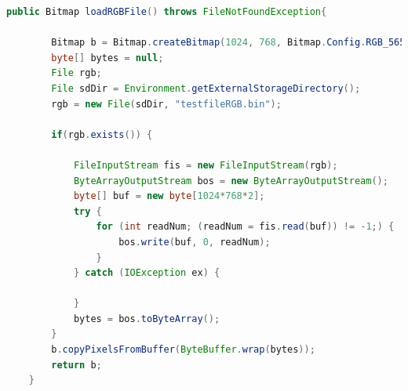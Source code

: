 \clearpage
\begin{lstlisting}[caption=Methode \textit{loadRGBFile()} zum Einlesen einer BIN-Datei im RGB565-Format zu Testzwecken, label=lst:BIN_to_Bitmap, language=Java]
public Bitmap loadRGBFile() throws FileNotFoundException{

        Bitmap b = Bitmap.createBitmap(1024, 768, Bitmap.Config.RGB_565);
        byte[] bytes = null;
        File rgb;
        File sdDir = Environment.getExternalStorageDirectory();
        rgb = new File(sdDir, "testfileRGB.bin");

        if(rgb.exists()) {

            FileInputStream fis = new FileInputStream(rgb);
            ByteArrayOutputStream bos = new ByteArrayOutputStream();
            byte[] buf = new byte[1024*768*2];
            try {
                for (int readNum; (readNum = fis.read(buf)) != -1;) {
                    bos.write(buf, 0, readNum);
                }
            } catch (IOException ex) {

            }
            bytes = bos.toByteArray();
        }
        b.copyPixelsFromBuffer(ByteBuffer.wrap(bytes));
        return b;
    }
\end{lstlisting}